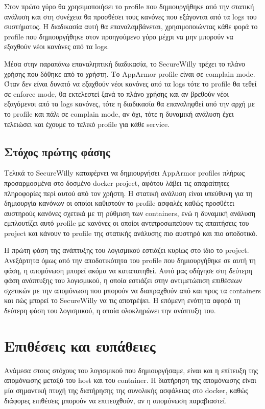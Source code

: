 Στον πρώτο γύρο θα χρησιμοποιήσει το \en profile\gr{} που δημιουργήθηκε από την στατική ανάλυση και στη συνέχεια θα προσθέσει τους κανόνες που εξάγονται από τα \en logs\gr{} του συστήματος. Η διαδικασία αυτή θα επαναλαμβάνεται, χρησιμοποιώντας κάθε φορά το \en profile\gr{} που δημιουργήθηκε στον προηγούμενο γύρο μέχρι να μην μπορούν να εξαχθούν νέοι κανόνες από τα \en logs\gr. 

Μέσα στην παραπάνω επαναληπτική διαδικασία, το \en SecureWilly\gr{} τρέχει το πλάνο χρήσης που δόθηκε από το χρήστη. Το \en AppArmor profile\gr{} είναι σε \en complain mode\gr{}. Όταν δεν είναι δυνατό να εξαχθούν νέοι κανόνες από τα \en logs\gr{} τότε το \en profile\gr{} θα τεθεί σε \en enforce mode\gr{}, θα εκτελεστεί ξανά το πλάνο χρήσης και αν βρεθούν νέοι εξαγόμενοι από τα \en logs\gr{} κανόνες, τότε η διαδικασία θα επαναληφθεί από την αρχή με το \en profile\gr{} και πάλι σε \en complain mode\gr{}, αν όχι, τότε η δυναμική ανάλυση έχει τελειώσει και έχουμε το τελικό \en profile\gr{} για κάθε \en service\gr{}.

\subsection*{Στόχος πρώτης φάσης}
Τελικά το \en SecureWilly\gr{} καταφέρνει να δημιουργήσει \en AppArmor profiles\gr{} πλήρως προσαρμοσμένα στο δοσμένο \en docker project\gr{}, αφότου λάβει τις απαραίτητες πληροφορίες περί αυτού από τον χρήστη. Η στατική ανάλυση είναι υπεύθυνη για τη δημιουργία κανόνων οι οποίοι καθιστούν το \en profile\gr{} ασφαλές καθώς προσθέτει αυστηρούς κανόνες σχετικά με τη ρύθμιση των \en containers\gr{}, ενώ η δυναμική ανάλυση εμπλουτίζει αυτό \en profile\gr{} με κανόνες οι οποίοι αντιπροσωπεύουν τις απαιτήσεις του \en project\gr{} και κάνουν το \en profile\gr{} της στατικής ανάλυσης πιο αυστηρό και πιο αποδοτικό.

Η πρώτη φάση της ανάπτυξης του λογισμικού εστιάζει κυρίως στο ίδιο το \en project\gr. Ανεξάρτητα όμως από την αποδοτικότητα του \en profile\gr{} που δημιουργήθηκε σε αυτή τη φάση, η απομόνωση μπορεί ακόμα να καταπατηθεί. Αυτό μας οδήγησε στη δεύτερη φάση ανάπτυξης του λογισμικού, η οποία εστιάζει στην αντιμετώπιση επιθέσεων σχετικών με την απομόνωση που μπορούν να διαπραχθούν από και προς τα \en containers\gr{} και πώς μπορεί το \en SecureWilly\gr{} να τις αποτρέψει. Η επόμενη ενότητα αφορά τη δεύτερη φάση του λογισμικού, η οποία ολοκληρώνει την ανάπτυξη του.

\section*{Επιθέσεις και ευπάθειες}
Ανάμεσα στους στόχους του λογισμικού που δημιουργήσαμε, είναι και η επίτευξη της απομόνωσης μεταξύ του \en host\gr{} και του \en container\gr{}. Η διατήρηση της απομόνωσης είναι μία σημαντική πτυχή της διατήρησης της συνολικής ασφάλειας στο \en docker\gr{}, καθώς διάφορες επιθέσεις μπορούν να επιτευχθούν, αν η απομόνωση παραβιαστεί.

